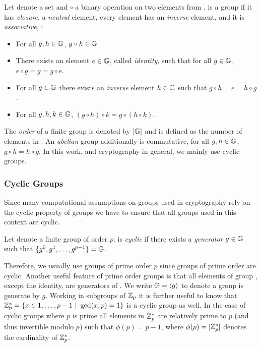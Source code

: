 \begin{definition}[Groups]\label{def:groups}
Let \GG denote a set and $\circ$ a binary operation on two elements from \GG.
\GG is a group if it has \emph{closure}, a \emph{neutral} element, every element has an \emph{inverse} element, and it is \emph{associative}, \ie :
\begin{itemize}
	\item For all $g,h\in\mathbb{G}$, $g\circ h \in\mathbb{G}$
	\item There exists an element $e\in\mathbb{G}$, called \emph{identity}, such that for all $g\in\mathbb{G}$, $e\circ g=g=g\circ e$.
	\item For all $g\in\mathbb{G}$ there exists an \emph{inverse} element $h\in\mathbb{G}$ such that $g\circ h=e=h\circ g$.
	\item For all $g,h,k\in\mathbb{G}$, $(g\circ h)\circ k=g\circ (h \circ k)$.
\end{itemize}
\eod
\end{definition}

\noindent
The \emph{order} of a finite group \GG is denoted by $|\mathbb{G}|$ and is defined as the number of elements in \GG.
An \emph{abelian} group additionally is commutative, \ie for all $g,h\in\mathbb{G}$, $g\circ h=h\circ g$.
In this work, and cryptography in general, we mainly use cyclic groups.

\subsubsection{Cyclic Groups}
Since many computational assumptions on groups used in cryptography rely on the cyclic property of groups we have to ensure that all groups used in this context are cyclic.

\begin{definition}\label{def:cyclicgroups}
Let \GG denote a finite group of order $p$.
\GG is \emph{cyclic} if there exists a \emph{generator} $g\in\mathbb{G}$ such that $\{g^0,g^1,\dots,g^{p-1}\}=\mathbb{G}$.
\eod
\end{definition}

\noindent
Therefore, we usually use groups of prime order $p$ since groups of prime order are cyclic.
Another useful feature of prime order groups is that all elements of group \GG, except the identity, are generators of \GG.
We write $\mathbb{G}=\langle g_{} \rangle$ to denote a group \GG is generate by $g$.
Working in subgroups of $\mathbb{Z}_p$ it is further useful to know that $\mathbb{Z}^\ast_p=\{x\in{1,\dots,p-1}~|~\gcd(x,p)=1\}$ is a cyclic group as well.
In the case of cyclic groups where $p$ is prime all elements in $\mathbb{Z}^\ast_p$ are relatively prime to $p$ (and thus invertible modulo $p$) such that $\phi(p)=p-1$, where $\phi(p)=|\mathbb{Z}^\ast_p|$ denotes the cardinality of $\mathbb{Z}^\ast_p$.


